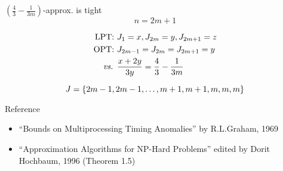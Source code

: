 \begin{frame}{$(\frac{4}{3} - \frac{1}{3m})$-approx. is tight}
  \[
	n = 2m + 1
  \]

  \begin{align*}
	\text{LPT: } &J_1 = x, J_{2m} = y, J_{2m+1} = z \\
	\text{OPT: } &J_{2m-1} = J_{2m} = J_{2m+1} = y \\
	\text{\it vs. } &\frac{x + 2y}{3y} = \frac{4}{3} - \frac{1}{3m}
  \end{align*}

  \[
	J = \{2m-1,2m-1,\dots,m+1,m+1,m,m,m\}
  \]

  \begin{alertblock}{Reference}
	\begin{itemize}
	  \item ``Bounds on Multiprocessing Timing Anomalies'' by R.L.Graham, 1969
	  \item ``Approximation Algorithms for NP-Hard Problems'' edited by Dorit Hochbaum, 1996 ({\small Theorem 1.5})
	\end{itemize}
  \end{alertblock}
\end{frame}
\begin{frame}{}
\end{frame}
\begin{frame}{}
\end{frame}
\begin{frame}{}
\end{frame}
